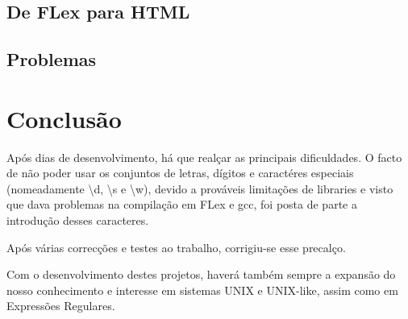\documentclass[11pt,a4paper]{report}
\begin{document}
\section{De FLex para HTML}

\pagebreak
\section{Problemas}




\chapter{Conclusão}

Após dias de desenvolvimento, há que realçar as principais dificuldades. O facto de não poder usar os conjuntos de letras, dígitos e caractéres especiais (nomeadamente \textbackslash d, \textbackslash s e \textbackslash w), devido a prováveis limitações de libraries e visto que dava problemas na compilação em FLex e gcc, foi posta de parte a introdução desses caracteres.

Após várias correcções e testes ao trabalho, corrigiu-se esse precalço.

Com o desenvolvimento destes projetos, haverá também sempre a expansão do nosso conhecimento e interesse em sistemas UNIX e UNIX-like, assim como em Expressões Regulares.
\end{document}
